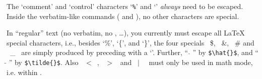 The `comment' and `control' characters `\texttt{\%}' and `\bsl'
\emph{always} need to be escaped.  Inside the verbatim-like commands
( and ), no other characters are special.

In ``regular'' text (no verbatim, no , \ldots), you currently must
escape all \LaTeX{} special characters, i.e.,
besides `\%', `\{', and `\}', the four specials
\ \$, \ \&, \ \# and \ \_ \ are simply produced by preceding with a
`\bsl'.
Further, `` $\hat{}$ '' by \verb|$\hat{}$|, and
        `` $\tilde{}$ ''  by \verb|$\tilde{}$|.
Also \ $<$\ , \ $>$ \  and \ $|$ \ \ must only be used in math mode, i.e. within .


